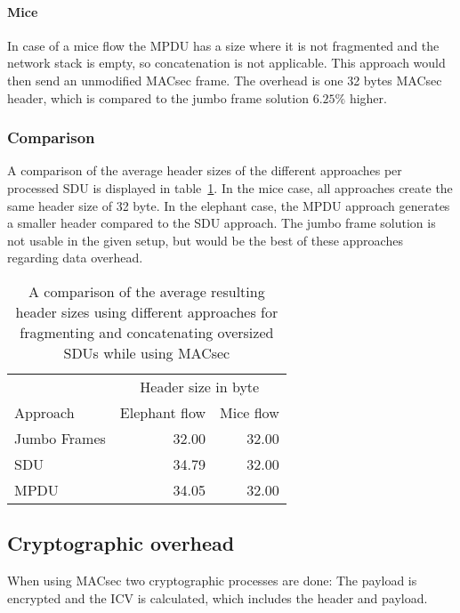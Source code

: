\paragraph{Mice}
In case of a mice flow the \gls{MPDU} has a size where it is not fragmented and the network stack is empty, so concatenation is not applicable.
This approach would then send an unmodified \gls{MACsec} frame.
The overhead is one 32 bytes \gls{MACsec} header, which is compared to the jumbo frame solution $6.25\%$ higher.

\subsubsection{Comparison}
A comparison of the average header sizes of the different approaches per processed \gls{SDU} is displayed in table~\ref{tab:draft-approach-comparison-header}.
In the mice case, all approaches create the same header size of 32 byte.
In the elephant case, the \gls{MPDU} approach generates a smaller header compared to the \gls{SDU} approach.
The jumbo frame solution is not usable in the given setup, but would be the best of these approaches regarding data overhead.

\begin{table}
  \centering
  \begin{tabular}{lrr}
    \toprule
    & \multicolumn{2}{c}{Header size in byte} \\ \cmidrule(r){2-3}
    Approach & Elephant flow & Mice flow\\
    \midrule
    Jumbo Frames & 32.00  & 32.00 \\
    SDU & 34.79  & 32.00 \\
    MPDU & 34.05  & 32.00 \\
    \bottomrule
  \end{tabular}
  \caption[Comparison of average header size for fragmentation design approaches]{A comparison of the average resulting header sizes using different approaches for fragmenting and concatenating oversized \glspl{SDU} while using \gls{MACsec}}
  \label{tab:draft-approach-comparison-header}
\end{table}

\subsection{Cryptographic overhead}
When using \gls{MACsec} two cryptographic processes are done: The payload is encrypted and the \gls{ICV} is calculated, which includes the header and payload.

